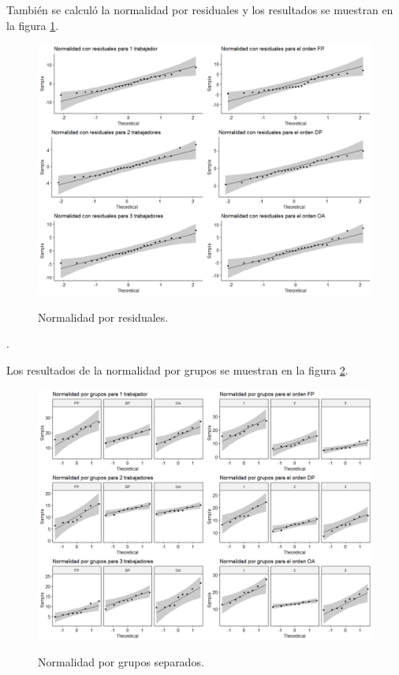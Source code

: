 \documentclass{article}
\begin{document}
También se calculó la normalidad por residuales y los resultados se muestran en la figura \ref{Figura 3}.

\begin{figure} [h!]%
    \caption{Normalidad por residuales.}
    \smallskip
    \centering
    \includegraphics[width=140mm]{Figura3.jpeg} %
    \label{Figura 3}
\end{figure} 

\newpage
.
\bigskip

Los resultados de la normalidad por grupos se muestran en la figura \ref{Figura 4}.

\begin{figure} [h!]%
    \caption{Normalidad por grupos separados.}
    \smallskip
    \centering
    \includegraphics[width=140mm]{Figura4.jpeg} %
    \label{Figura 4}
\end{figure}
\end{document}
